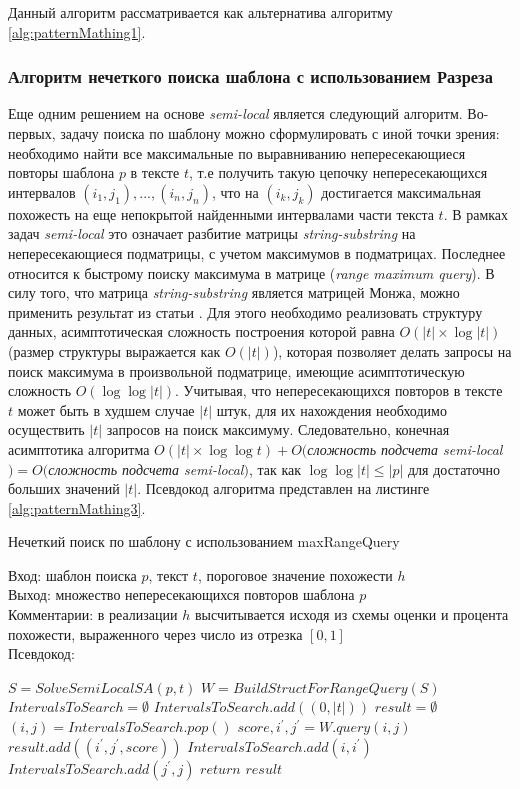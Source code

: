 Данный алгоритм рассматривается как альтернатива алгоритму \ref{alg:patternMathing1}.

\subsubsection{Алгоритм нечеткого поиска шаблона с использованием Разреза}

Еще одним решением на основе \emph{semi-local} является следующий алгоритм.
Во-первых, задачу поиска по шаблону можно сформулировать с иной точки зрения: 
необходимо найти все максимальные по выравниванию непересекающиеся повторы шаблона $p$ в тексте $t$, т.е получить такую цепочку непересекающихся интервалов $(i_1,j_1),...,(i_n,j_n)$, что на $(i_k,j_k)$ достигается максимальная похожесть на еще непокрытой найденными интервалами части текста $t$.
В рамках задач \emph{semi-local} это означает разбитие матрицы \emph{string-substring} на непересекающиеся подматрицы, с учетом максимумов в подматрицах.
Последнее относится к быстрому поиску максимума в матрице (\emph{range maximum query}).
В силу того, что матрица \emph{string-substring} является матрицей Монжа, можно применить результат из статьи  \cite{gawrychowski2020submatrix}. 
Для этого необходимо реализовать структуру данных, асимптотическая сложность построения которой равна $O(|t|\times \log |t|)$ (размер структуры выражается как $O(|t|)$), которая позволяет делать запросы на поиск максимума в произвольной подматрице, имеющие асимптотическую сложность $O(\log \log|t|)$.
Учитывая, что непересекающихся повторов в тексте $t$ может быть в худшем случае $|t|$ штук,
для их нахождения необходимо осуществить $|t|$ запросов на поиск максимуму.
Следовательно, конечная асимптотика алгоритма $O(|t| \times \log \log t) +O($\emph{сложность подсчета 
semi-local}$)=O($\emph{сложность подсчета 
semi-local}$)$, так как $\log \log |t| \leq |p|$ для достаточно больших значений $|t|$. 
Псевдокод алгоритма представлен на листинге \ref{alg:patternMathing3}.

\begin{algorithm}[h]
\caption{Нечеткий поиск по шаблону с использованием maxRangeQuery}\label{alg:patternMathing3}
Вход: шаблон поиска $p$, текст $t$, пороговое значение похожести $h$\\
Выход: множество непересекающихся повторов шаблона $p$\\
Комментарии: в реализации $h$ высчитывается исходя из схемы оценки и процента похожести, выраженного через число из отрезка $[0,1]$\\
Псевдокод:
\begin{algorithmic}[1]
\State $S = SolveSemiLocalSA(p,t)$
\State $W = BuildStructForRangeQuery(S)$
\State $IntervalsToSearch = \emptyset $
\State$IntervalsToSearch.add((0,|t|))$
\State $result = \emptyset$
    \State $(i,j) = IntervalsToSearch.pop()$
    \State $score,i^{'},j^{'} = W.query(i,j)$
    \State $result.add(( i^{'},j^{'},score ))$
    \State $IntervalsToSearch.add(i,i^{'})$        \State $IntervalsToSearch.add(j^{'},j)$
    \EndIf
\EndWhile
\State $return$ $result$

\end{algorithmic}
\end{algorithm}


